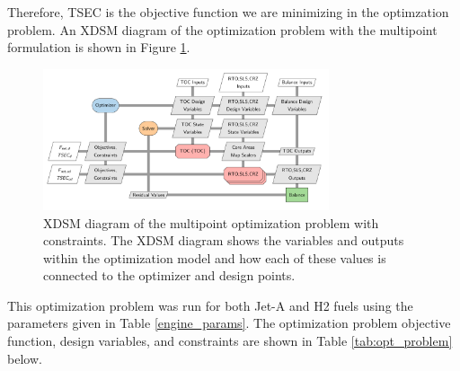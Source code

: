 \documentclass[conf]{new-aiaa}
\begin{document}
Therefore, TSEC is the objective function we are minimizing in the optimzation problem.
An XDSM diagram of the optimization problem with the multipoint formulation is shown in Figure \ref{fig:N3_xdsm_opt}.

\begin{figure}[!hbt]
    \centering
    \includegraphics[width=0.75\textwidth]{N3_xdsm_opt.pdf}
    \caption{
        XDSM diagram of the multipoint optimization problem with constraints.
        The XDSM diagram shows the variables and outputs within the optimization model and how each of these values is connected to the optimizer and design points.}
    \label{fig:N3_xdsm_opt}
\end{figure}

This optimization problem was run for both Jet-A and H2 fuels using the parameters given in Table \ref{engine_params}.
The optimization problem objective function, design variables, and constraints are shown in Table \ref{tab:opt_problem} below.
\end{document}
